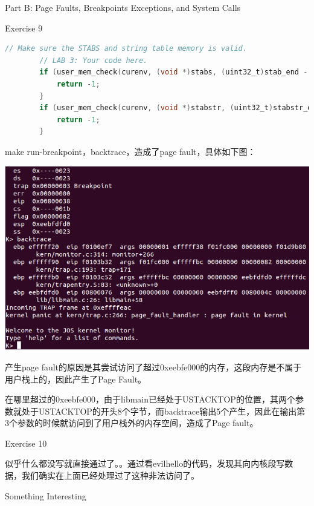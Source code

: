 \documentclass[GBK,winfonts,a4paper,10pt]{ctexart}
\begin{document}
\begin{section}{ Part B: Page Faults, Breakpoints Exceptions, and System Calls }
\begin{subsection}{ Exercise 9 }
\begin{lstlisting}[language=C]
		// Make sure the STABS and string table memory is valid.
		// LAB 3: Your code here.
		if (user_mem_check(curenv, (void *)stabs, (uint32_t)stab_end - (uint32_t)stabs, PTE_U) < 0) {
			return -1;
		}
		if (user_mem_check(curenv, (void *)stabstr, (uint32_t)stabstr_end - (uint32_t)stabstr, PTE_U) < 0) {
			return -1;
		}
\end{lstlisting}
\par
make run-breakpoint，backtrace，造成了page fault，具体如下图：
\par
\includegraphics[scale=0.5]{backtrace.png}
\par
产生page fault的原因是其尝试访问了超过0xeebfe000的内存，这段内存是不属于用户栈上的，因此产生了Page Fault。
\par
在哪里超过的0xeebfe000，由于libmain已经处于USTACKTOP的位置，其两个参数就处于USTACKTOP的开头8个字节，而backtrace输出5个产生，因此在输出第3个参数的时候就访问到了用户栈外的内存空间，造成了Page fault。
\end{subsection}

\begin{subsection}{ Exercise 10 }
\par
似乎什么都没写就直接通过了。。通过看evilhello的代码，发现其向内核段写数据，我们确实在上面已经处理过了这种非法访问了。
\end{subsection}

\end{section}

\begin{section}{ Something Interesting }

\end{section}
\end{document}
